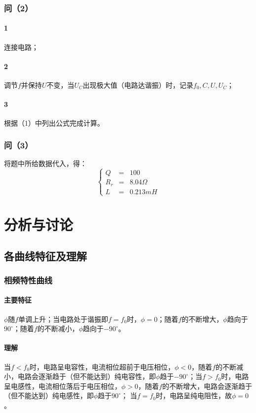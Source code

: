 \documentclass{ctexart}
\begin{document}
\subsubsection{问（2）}
\paragraph{1}连接电路；
\paragraph{2}调节$f$并保持$U$不变，当$U_C$出现极大值（电路达谐振）时，记录$f_0,C,U,U_C$；
\paragraph{3}根据（1）中列出公式完成计算。
\subsubsection{问（3）}
将题中所给数据代入，得：
$$ \left\{
  \begin{aligned}
  Q & = & 100 \\
  R_r & = & 8.04\Omega \\
  L & = & 0.213 mH
  \end{aligned}
  \right.
  $$
  \section{分析与讨论}
  \subsection{各曲线特征及理解}
  \subsubsection{相频特性曲线}
  \paragraph{主要特征}$\phi$随$f$单调上升；当电路处于谐振即$f=f_0$时，$\phi=0$；随着$f$的不断增大，$\phi$趋向于$90^\circ$；随着$f$的不断减小，$\phi$趋向于$-90^\circ$。
  \paragraph{理解}当$f<f_0$时，电路呈电容性，电流相位超前于电压相位，$\phi<0$，随着$f$的不断减小，电路会逐渐趋于（但不能达到）纯电容性，即$\phi$趋于$-90^\circ$；当$f>f_0$时，电路呈电感性，电流相位落后于电压相位，$\phi>0$，随着$f$的不断增大，电路会逐渐趋于（但不能达到）纯电感性，即$\phi$趋于$90^\circ$；
当$f=f_0$时，电路呈纯电阻性，故$\phi=0$。
\end{document}
